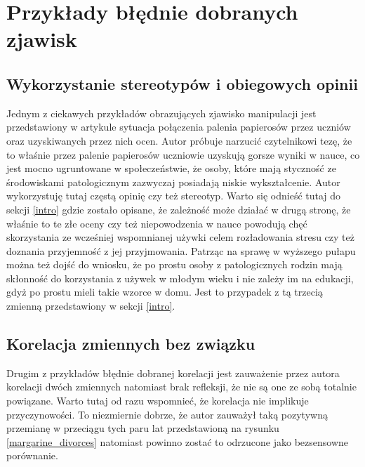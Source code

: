 \documentclass{classrep}
\begin{document}
    \section{Przykłady błędnie dobranych zjawisk}
    \label{wrong_examples} {

        \subsection{Wykorzystanie stereotypów i obiegowych opinii}
        \label{wrong_examples:stereotypes} {
            Jednym z ciekawych przykładów obrazujących zjawisko manipulacji jest
            przedstawiony w artykule \cite{medium_article} sytuacja połączenia palenia
            papierosów przez uczniów oraz uzyskiwanych przez nich ocen. Autor próbuje
            narzucić czytelnikowi tezę, że to właśnie przez palenie papierosów uczniowie
            uzyskują gorsze wyniki w nauce, co jest mocno ugruntowane w społeczeństwie, że
            osoby, które mają styczność ze środowiskami patologicznym zazwyczaj posiadają
            niskie wykształcenie. Autor wykorzystuję tutaj częstą opinię czy też
            stereotyp. Warto się odnieść tutaj do sekcji \ref{intro} gdzie zostało
            opisane, że zależność może działać w drugą stronę, że właśnie to te złe
            oceny czy też niepowodzenia w nauce powodują chęć skorzystania ze wcześniej
            wspomnianej używki celem rozładowania stresu czy też doznania przyjemność z
            jej przyjmowania. Patrząc na sprawę w wyższego pułapu można też dojść do
            wniosku, że po prostu osoby z patologicznych rodzin mają skłonność do
            korzystania z używek w młodym wieku i nie zależy im na edukacji, gdyż
            po prostu mieli takie wzorce w domu. Jest to przypadek z tą trzecią zmienną
            przedstawiony w sekcji \ref{intro}.
        }

        \subsection{Korelacja zmiennych bez związku}
        \label{wrong_examples:no_relationship} {
            Drugim z przykładów błędnie dobranej korelacji jest zauważenie przez autora
            korelacji dwóch zmiennych natomiast brak refleksji, że nie są one ze sobą
            totalnie powiązane. Warto tutaj od razu wspomnieć, że korelacja nie
            implikuje przyczynowości. To niezmiernie dobrze, że autor zauważył taką
            pozytywną przemianę w przeciągu tych paru lat przedstawioną na rysunku
            \ref{margarine_divorces} natomiast powinno zostać to odrzucone jako
            bezsensowne porównanie.

}}
\end{document}
